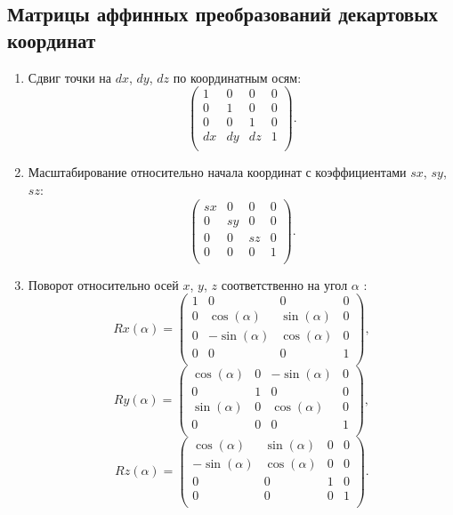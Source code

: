 \subsection{Матрицы аффинных преобразований декартовых координат}
\begin{enumerate}
	\item Сдвиг точки на $dx$, $dy$, $dz$ по координатным осям:
	\begin{equation}
		\label{eq:T}
		\begin{pmatrix}
			1 & 0 & 0 & 0 \\
			0 & 1 & 0 & 0 \\
			0 & 0 & 1 & 0 \\
			dx & dy & dz & 1 \\
		\end{pmatrix}.
	\end{equation}
	\item Масштабирование относительно начала координат с коэффициентами $sx$, $sy$, $sz$:
	\begin{equation}
	\label{eq:S}
	\begin{pmatrix}
		sx & 0 & 0 & 0 \\
		0 & sy & 0 & 0 \\
		0 & 0 & sz & 0 \\
		0 & 0 & 0 & 1 \\
	\end{pmatrix}.
\end{equation}
	\item Поворот относительно осей $x$, $y$, $z$ соответственно на угол  $\alpha$ :
	\begin{equation}
	\label{eq:X}
		Rx(\alpha) = \begin{pmatrix}
		1 & 0 & 0 & 0 \\
		0 & \cos(\alpha) & \sin(\alpha) & 0 \\
		0 & -\sin(\alpha) & \cos(\alpha) & 0 \\
		0 & 0 & 0 & 1 \\
	\end{pmatrix},
\end{equation}	
\begin{equation}
\label{eq:Y}
Ry(\alpha) = \begin{pmatrix}
	\cos(\alpha) & 0 & -\sin(\alpha) & 0 \\
	0 & 1 & 0 & 0 \\
	\sin(\alpha) & 0 & \cos(\alpha) & 0 \\
	0 & 0 & 0 & 1 \\
\end{pmatrix},
\end{equation}	
\begin{equation}
\label{eq:Z}
Rz(\alpha) = \begin{pmatrix}
\cos(\alpha) & \sin(\alpha) & 0 & 0 \\
	-\sin(\alpha) & \cos(\alpha) & 0 & 0 \\
	0 & 0 & 1 & 0 \\
	0 & 0 & 0 & 1 \\
\end{pmatrix}.
\end{equation}
\end{enumerate}

